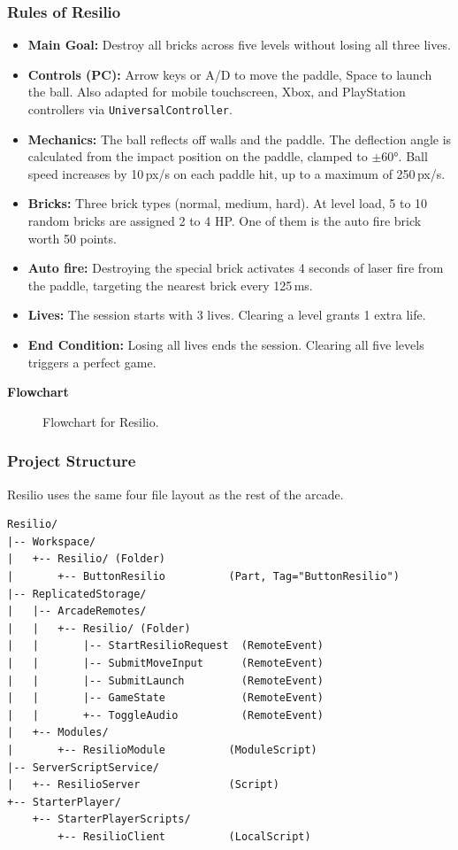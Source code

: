 \documentclass[12pt,letterpaper]{article}
\begin{document}
\subsubsection{Rules of Resilio}
\begin{itemize}
  \item \textbf{Main Goal:} Destroy all bricks across five levels without losing all three lives.
  \item \textbf{Controls (PC):} Arrow keys or A/D to move the paddle, Space to launch the ball. Also adapted for mobile touchscreen, Xbox, and PlayStation controllers via \texttt{UniversalController}.
  \item \textbf{Mechanics:} The ball reflects off walls and the paddle. The deflection angle is calculated from the impact position on the paddle, clamped to $\pm60°$. Ball speed increases by 10\,px/s on each paddle hit, up to a maximum of 250\,px/s.
  \item \textbf{Bricks:} Three brick types (normal, medium, hard). At level load, 5 to 10 random bricks are assigned 2 to 4 HP. One of them is the auto fire brick worth 50 points.
  \item \textbf{Auto fire:} Destroying the special brick activates 4 seconds of laser fire from the paddle, targeting the nearest brick every 125\,ms.
  \item \textbf{Lives:} The session starts with 3 lives. Clearing a level grants 1 extra life.
  \item \textbf{End Condition:} Losing all lives ends the session. Clearing all five levels triggers a perfect game.
\end{itemize}

\textbf{Flowchart}
\begin{figure}[H]
  \centering
  
  \caption{Flowchart for Resilio.}
  \label{fig:resilio_flow}
\end{figure}

\subsubsection{Project Structure}

Resilio uses the same four file layout as the rest of the arcade.

\begin{lstlisting}
Resilio/
|-- Workspace/
|   +-- Resilio/ (Folder)
|       +-- ButtonResilio          (Part, Tag="ButtonResilio")
|-- ReplicatedStorage/
|   |-- ArcadeRemotes/
|   |   +-- Resilio/ (Folder)
|   |       |-- StartResilioRequest  (RemoteEvent)
|   |       |-- SubmitMoveInput      (RemoteEvent)
|   |       |-- SubmitLaunch         (RemoteEvent)
|   |       |-- GameState            (RemoteEvent)
|   |       +-- ToggleAudio          (RemoteEvent)
|   +-- Modules/
|       +-- ResilioModule          (ModuleScript)
|-- ServerScriptService/
|   +-- ResilioServer              (Script)
+-- StarterPlayer/
    +-- StarterPlayerScripts/
        +-- ResilioClient          (LocalScript)
\end{lstlisting}
\end{document}
